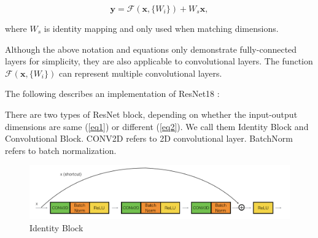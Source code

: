 \begin{equation} \label{eq2}
\mathbf{y} = \mathcal{F} (\mathbf{x}, \{W_i\}) + W_s \mathbf{x},
\end{equation}

where $W_s$ is identity mapping and only used when matching dimensions. 

Although the above notation and equations only demonstrate fully-connected layers for simplicity, they are also applicable to convolutional layers. The function $\mathcal{F} (\mathbf{x}, \{W_i\})$ can represent multiple convolutional layers.

The following describes an implementation of ResNet18 \citep{resnet_implement}:

There are two types of ResNet block, depending on whether the input-output dimensions are same (\ref{eq1}) or different (\ref{eq2}). We call them Identity Block and Convolutional Block. CONV2D refers to 2D convolutional layer. BatchNorm refers to batch normalization.

\begin{figure}[h]
	\centering
	\includegraphics[width=\textwidth]{Figs/identityblock.png}
    \caption{Identity Block \citep{resnet_implement}}
    \label{identityblock}
\end{figure}

